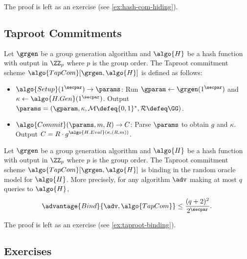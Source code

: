 The proof is left as an exercise (see \autoref{ex:hash-com-hiding}).

\subsection{Taproot Commitments}

\begin{definition}
  Let $\grgen$ be a group generation algorithm and $\algo{H}$ be a hash function with output in $\ZZ_p$ where $p$ is the group order. 
  The Taproot commitment scheme $\algo{TapCom}[\grgen, \algo{H}]$ is defined as follows:
  \begin{itemize}
    \item $\algo{Setup}(1^\secpar) \rightarrow \params$: Run $\gparam \gets \grgen(1^\secpar)$ and $\kappa \gets \algo{H.Gen}(1^\secpar)$. Output $\params = (\gparam, \kappa, \mathcal{M} \defeq \{0,1\}^*, \mathcal{R} \defeq \GG)$.
    \item $\algo{Commit}(\params, m, R) \rightarrow C$: Parse $\params$ to obtain $g$ and $\kappa$. Output $C = R \cdot g^{\algo{H.Eval}(\kappa, (R, m))}$.
  \end{itemize}
\end{definition}

\begin{lemma}\label{lem:taproot-binding}
  Let $\grgen$ be a group generation algorithm and $\algo{H}$ be a hash function with output in $\ZZ_p$ where $p$ is the group order.
  The Taproot commitment scheme $\algo{TapCom}[\grgen, \algo{H}]$ is binding in the random oracle model for $\algo{H}$.
  More precisely, for any algorithm $\adv$ making at most $q$ queries to $\algo{H}$,
  \[
  \advantage{Bind}{\adv, \algo{TapCom}} \leq \frac{(q+2)^2}{2^\secpar}.
  \]
\end{lemma}

The proof is left as an exercise (see \autoref{ex:taproot-binding}).

\subsection{Exercises}

